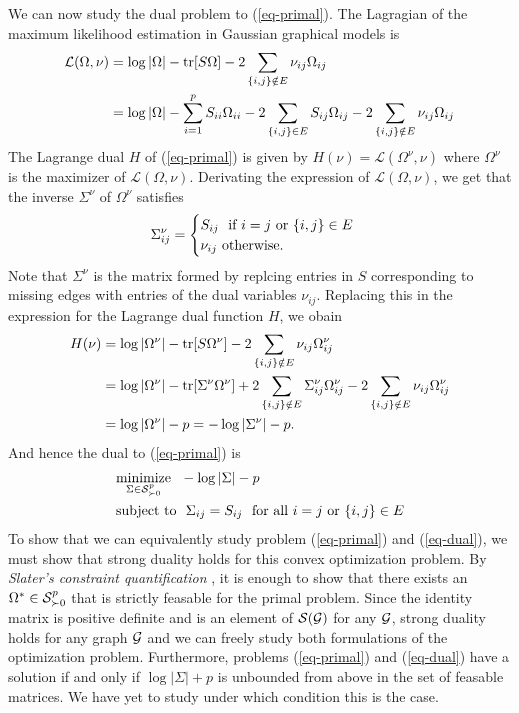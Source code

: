 We can now study the dual problem to (\ref{eq-primal}). The Lagragian of the maximum likelihood estimation in Gaussian graphical models is
\begin{align*}
    \mathcal{L}(\Omega, \nu)
    &= \log |\Omega| - \tr[S\Omega] - 2 \sum_{\eset{i, j} \notin E} \nu_{ij}\Omega_{ij}\\
    &= \log |\Omega| - \sum_{i=1}^p S_{ii}\Omega_{ii} - 2 \sum_{\eset{i,j} \in E} S_{ij}\Omega_{ij} - 2 \sum_{\eset{i, j} \notin E} \nu_{ij}\Omega_{ij}
\end{align*}
The Lagrange dual $H$ of (\ref{eq-primal}) is given by $H(\nu) = \mathcal{L}(\Omega^\nu, \nu)$ where $\Omega^\nu$ is the maximizer of $\mathcal{L}(\Omega, \nu)$. Derivating the expression of $\mathcal{L}(\Omega, \nu)$, we get that the inverse $\Sigma^\nu$ of $\Omega^\nu$ satisfies
\begin{equation*}
    \Sigma^\nu_{ij} = \begin{cases}
        S_{ij}\ \t{ if } i = j \t{ or } \eset{i, j} \in E\\
        \nu_{ij}\ \t{otherwise}.
    \end{cases}
\end{equation*}
Note that $\Sigma^\nu$ is the matrix formed by replcing entries in $S$ corresponding to missing edges with entries of the dual variables $\nu_{ij}$. Replacing this in the expression for the Lagrange dual function $H$, we obain
\begin{align*}
    H(\nu) 
    &= \log |\Omega^\nu| - \tr[S\Omega^\nu] - 2 \sum_{\eset{i, j} \notin E} \nu_{ij}\Omega^\nu_{ij}\\
    &= \log |\Omega^\nu| - \tr[\Sigma^\nu\Omega^\nu] + 2 \sum_{\eset{i, j} \notin E} \Sigma^\nu_{ij}\Omega^\nu_{ij} - 2 \sum_{\eset{i, j} \notin E} \nu_{ij}\Omega^\nu_{ij}\\
    &= \log |\Omega^\nu| - p = -\log |\Sigma^\nu| - p.
\end{align*}
And hence the dual to (\ref{eq-primal}) is
\begin{align} \label{eq-dual}
    \begin{split}
        &\underset{\Sigma \in \S^p_{\succ 0}}{\t{minimize}}\ \  -\log |\Sigma| - p\\
        &\t{subject to}\ \ \Sigma_{ij} = S_{ij}\ \t{ for all } i = j \t{ or } \eset{i, j} \in E
    \end{split}
\end{align}
To show that we can equivalently study problem (\ref{eq-primal}) and (\ref{eq-dual}), we must show that strong duality holds for this convex optimization problem. By \textit{Slater's constraint quantification} \cite[Section 5.3.2]{boyd2004convex}, it is enough to show that there exists an $\Omega^* \in \S^p_{\succ 0}$ that is strictly feasable for the primal problem. Since the identity matrix is positive definite and is an element of $\S(\G)$ for any $\G$, strong duality holds for any graph $\G$ and we can freely study both formulations of the optimization problem. Furthermore, problems (\ref{eq-primal}) and (\ref{eq-dual}) have a solution if and only if $\log |\Sigma| + p$ is unbounded from above in the set of feasable matrices. We have yet to study under which condition this is the case.

